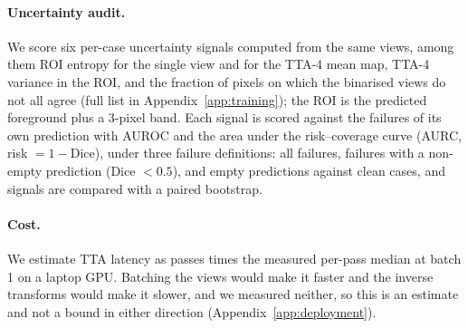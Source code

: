 \paragraph{Uncertainty audit.} We score six per-case uncertainty signals computed from the same views, among them ROI entropy for the single view and for the TTA-4 mean map, TTA-4 variance in the ROI, and the fraction of pixels on which the binarised views do not all agree (full list in Appendix~\ref{app:training}); the ROI is the predicted foreground plus a 3-pixel band. Each signal is scored against the failures of its own prediction with AUROC and the area under the risk--coverage curve (AURC, risk $=1-$Dice), under three failure definitions: all failures, failures with a non-empty prediction (Dice $<0.5$), and empty predictions against clean cases, and signals are compared with a paired bootstrap.

\paragraph{Cost.} We estimate TTA latency as passes times the measured per-pass median at batch 1 on a laptop GPU. Batching the views would make it faster and the inverse transforms would make it slower, and we measured neither, so this is an estimate and not a bound in either direction (Appendix~\ref{app:deployment}).